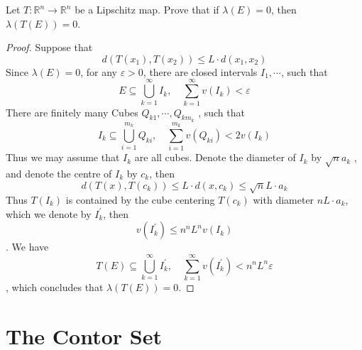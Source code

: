 \documentclass[../main.tex]{subfiles}
\begin{document}
\begin{exercise}{}{}
    Let \(  T: \mathbb{R} ^{n}\to \mathbb{R} ^{n}  \) be a Lipschitz map. Prove that if \(   \lambda \left( E \right)= 0   \), then \(   \lambda \left( T\left( E \right)  \right)= 0   \).    
\end{exercise}
\begin{proof}
    Suppose that \[
    d\left( T\left( x_1 \right),T\left( x_2 \right)   \right)\le  L \cdot d\left( x_1,x_2 \right)  
    \] Since \(   \lambda \left( E \right)= 0   \), for any \(   \varepsilon > 0  \), there are closed intervals \(  I_1,\cdots   \), such that \[
     E\subseteq \bigcup_{k= 1}^{\infty}I _{k},\quad \sum _{k= 1}^{\infty}v\left( I_{k} \right)<  \varepsilon    
    \]There are finitely many Cubes \(  Q_{k1},\cdots ,Q _{k m_{k}}  \) , such that  \[
    I _{k}\subseteq \bigcup _{ i = 1}^{m_{k}}Q_{k i},\quad  \sum _{i = 1}^{m_{k}}v\left( Q_{k i} \right)< 2v\left( I_{k} \right)  
    \]Thus we may assume that \(  I _{k}  \) are all cubes. Denote the diameter of \(  I_{k}  \) by \(  \sqrt{n}a_{k}  \) , and denote the centre of \(  I_{k}  \) by \(  c_{k}  \), then \[
    d\left( T\left( x \right),T\left( c_{k} \right)   \right)\le L\cdot d\left( x,c_{k} \right)\le \sqrt{n}L\cdot a_{k}  
    \]Thus \(  T\left( I_{k} \right)   \) is contained by the cube centering \(  T\left( c_{k} \right)   \) with diameter \( n L \cdot a_{k}  \), which we denote by \(  I^{\prime} _{k}  \), then \[
    v\left( I^{\prime} _{k} \right)\le n^{n} L^{n}v\left( I_{k} \right)  
    \]. We have \[
    T\left( E \right)\subseteq \bigcup _{k = 1}^{\infty}I^{\prime} _{k},\quad  \sum _{k = 1}^{\infty}v\left( I^{\prime} _{k} \right)< n^{n}L^{n} \varepsilon   
    \], which concludes that \(   \lambda \left( T\left( E \right)  \right)= 0   \).          
\end{proof}

\section{The Contor Set}
\end{document}
